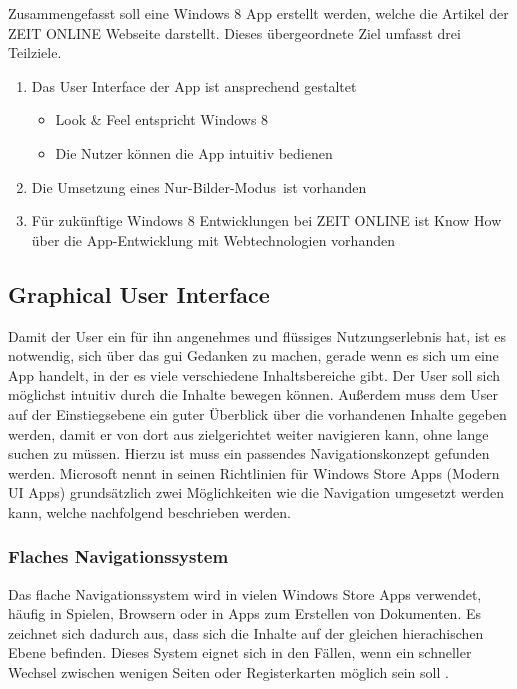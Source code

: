 \documentclass[12pt,a4paper,bibtotoc,abstracton]{scrartcl}
\begin{document}
Zusammengefasst soll eine Windows 8 App erstellt werden, welche die Artikel der ZEIT ONLINE Webseite darstellt. Dieses übergeordnete Ziel umfasst drei Teilziele.

\begin{enumerate}
	\item Das User Interface der App ist ansprechend gestaltet
	\begin{itemize}
		\item Look \& Feel entspricht Windows 8
		\item Die Nutzer können die App intuitiv bedienen
	\end{itemize}
	\item Die Umsetzung eines \glqq Nur-Bilder-Modus\grqq\ ist vorhanden
	\item Für zukünftige Windows 8 Entwicklungen bei ZEIT ONLINE ist Know How über die App-Entwicklung mit Webtechnologien vorhanden
\end{enumerate}


\subsection{Graphical User Interface}
\label{subsec:gui}
Damit der User ein für ihn angenehmes und flüssiges Nutzungserlebnis hat, ist es notwendig, sich über das \ac{gui} Gedanken zu machen, gerade wenn es sich um eine App handelt, in der es viele verschiedene Inhaltsbereiche gibt. Der User soll sich möglichst intuitiv durch die Inhalte bewegen können. Außerdem muss dem User auf der Einstiegsebene ein guter Überblick über die vorhandenen Inhalte gegeben werden, damit er von dort aus zielgerichtet weiter navigieren kann, ohne lange suchen zu müssen. Hierzu ist muss ein passendes Navigationskonzept gefunden werden.  Microsoft nennt in seinen Richtlinien für Windows Store Apps (Modern UI Apps) grundsätzlich zwei Möglichkeiten wie die Navigation umgesetzt werden kann, welche nachfolgend beschrieben werden.

\subsubsection{Flaches Navigationssystem}
\label{subsubsec:flachessystem}
Das flache Navigationssystem wird in vielen Windows Store Apps verwendet, häufig in Spielen, Browsern oder in Apps zum Erstellen von Dokumenten. Es zeichnet sich dadurch aus, dass sich die Inhalte auf der gleichen hierachischen Ebene befinden. Dieses System eignet sich in den Fällen, wenn ein schneller Wechsel zwischen wenigen Seiten oder Registerkarten möglich sein soll \citep{MicrosoftNavidesign2013}.
\end{document}

